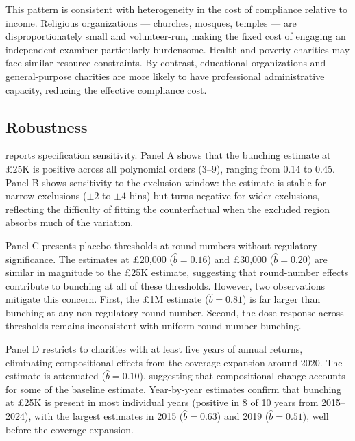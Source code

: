 \documentclass[12pt]{article}
\begin{document}
This pattern is consistent with heterogeneity in the cost of compliance relative to income. Religious organizations --- churches, mosques, temples --- are disproportionately small and volunteer-run, making the fixed cost of engaging an independent examiner particularly burdensome. Health and poverty charities may face similar resource constraints. By contrast, educational organizations and general-purpose charities are more likely to have professional administrative capacity, reducing the effective compliance cost.



\subsection{Robustness}

 reports specification sensitivity. Panel A shows that the bunching estimate at \pounds25K is positive across all polynomial orders (3--9), ranging from 0.14 to 0.45. Panel B shows sensitivity to the exclusion window: the estimate is stable for narrow exclusions ($\pm 2$ to $\pm 4$ bins) but turns negative for wider exclusions, reflecting the difficulty of fitting the counterfactual when the excluded region absorbs much of the variation.

Panel C presents placebo thresholds at round numbers without regulatory significance. The estimates at \pounds20,000 ($\hat{b} = 0.16$) and \pounds30,000 ($\hat{b} = 0.20$) are similar in magnitude to the \pounds25K estimate, suggesting that round-number effects contribute to bunching at all of these thresholds. However, two observations mitigate this concern. First, the \pounds1M estimate ($\hat{b} = 0.81$) is far larger than bunching at any non-regulatory round number. Second, the dose-response across thresholds remains inconsistent with uniform round-number bunching.

Panel D restricts to charities with at least five years of annual returns, eliminating compositional effects from the coverage expansion around 2020. The estimate is attenuated ($\hat{b} = 0.10$), suggesting that compositional change accounts for some of the baseline estimate. Year-by-year estimates confirm that bunching at \pounds25K is present in most individual years (positive in 8 of 10 years from 2015--2024), with the largest estimates in 2015 ($\hat{b} = 0.63$) and 2019 ($\hat{b} = 0.51$), well before the coverage expansion.
\end{document}
